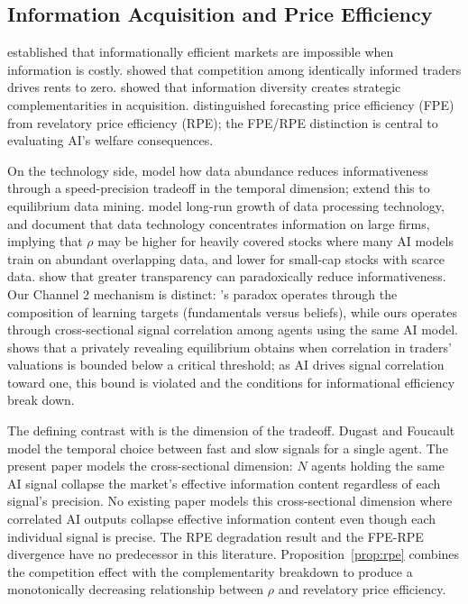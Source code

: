 \subsection{Information Acquisition and Price Efficiency}

\citet{grossman1980} established that informationally efficient markets are impossible when information is costly. \citet{holden1992} showed that competition among identically informed traders drives rents to zero. \citet{goldstein2015} showed that information diversity creates strategic complementarities in acquisition. \citet{bond2012} distinguished forecasting price efficiency (FPE) from revelatory price efficiency (RPE); the FPE/RPE distinction is central to evaluating AI's welfare consequences.

On the technology side, \citet{dugast2018} model how data abundance reduces informativeness through a speed-precision tradeoff in the temporal dimension; \citet{dugast2025} extend this to equilibrium data mining. \citet{farboodi2020} model long-run growth of data processing technology, and \citet{farboodi2022} document that data technology concentrates information on large firms, implying that $\rho$ may be higher for heavily covered stocks where many AI models train on abundant overlapping data, and lower for small-cap stocks with scarce data. \citet{banerjee2018} show that greater transparency can paradoxically reduce informativeness. Our Channel 2 mechanism is distinct: \citeauthor{banerjee2018}'s paradox operates through the composition of learning targets (fundamentals versus beliefs), while ours operates through cross-sectional signal correlation among agents using the same AI model. \citet{vives2014} shows that a privately revealing equilibrium obtains when correlation in traders' valuations is bounded below a critical threshold; as AI drives signal correlation toward one, this bound is violated and the conditions for informational efficiency break down.

The defining contrast with \citet{dugast2018} is the dimension of the tradeoff. Dugast and Foucault model the temporal choice between fast and slow signals for a single agent. The present paper models the cross-sectional dimension: $N$ agents holding the same AI signal collapse the market's effective information content regardless of each signal's precision. No existing paper models this cross-sectional dimension where correlated AI outputs collapse effective information content even though each individual signal is precise. The RPE degradation result and the FPE-RPE divergence have no predecessor in this literature. Proposition~\ref{prop:rpe} combines the \citet{holden1992} competition effect with the \citet{goldstein2015} complementarity breakdown to produce a monotonically decreasing relationship between $\rho$ and revelatory price efficiency.

